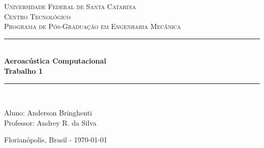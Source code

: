 \begin{capa}

\newcommand{\HRule}{\rule{\linewidth}{0.5mm}} %


\centering %
\vspace{-2cm}
\textsc{\LARGE Universidade Federal de Santa Catarina}\\[0.5cm] 
\textsc{\large Centro Tecnológico}\\ %
\textsc{\large Programa de Pós-Graduação em Engenharia Mecânica}\\[4cm] %

	
\HRule \\[1cm]
{ \huge \bfseries Aeroacústica Computacional   }\\[1.5cm] %
{ \huge \bfseries Trabalho 1 }\\[1cm] 
\HRule \\[6cm]
	
	 
	\begin{flushleft}
	\Large Aluno: Anderson Bringhenti \\[0.5cm]
	\Large Professor: Andrey R. da Silva
	\end{flushleft}
	\vspace{2cm}
	{\large Florianópolis, Brasil - \today} %
	\vfill %
\end{capa}



